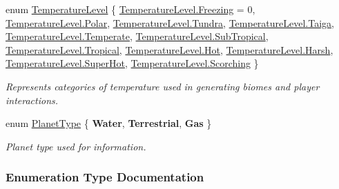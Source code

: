 \begin{DoxyCompactItemize}
\item 
enum \hyperlink{namespace_midnight_blue_a6ea6484178cbe707f25d1a0ed56db7ab}{Temperature\+Level} \{ \newline
\hyperlink{namespace_midnight_blue_a6ea6484178cbe707f25d1a0ed56db7aba64a54c31b5b440b2f5a00a723df03ec4}{Temperature\+Level.\+Freezing} = 0, 
\hyperlink{namespace_midnight_blue_a6ea6484178cbe707f25d1a0ed56db7abae266cfd65ad46a67fc54b0efd38e40dd}{Temperature\+Level.\+Polar}, 
\hyperlink{namespace_midnight_blue_a6ea6484178cbe707f25d1a0ed56db7abac63e2bf2eb1c92832e0a76fb3734abe8}{Temperature\+Level.\+Tundra}, 
\hyperlink{namespace_midnight_blue_a6ea6484178cbe707f25d1a0ed56db7aba32864c09ef538453b4d8110734ee355b}{Temperature\+Level.\+Taiga}, 
\newline
\hyperlink{namespace_midnight_blue_a6ea6484178cbe707f25d1a0ed56db7abae83280629ee0ad3886e8921fb8927ced}{Temperature\+Level.\+Temperate}, 
\hyperlink{namespace_midnight_blue_a6ea6484178cbe707f25d1a0ed56db7abaee38ff3caffad90ba40d7fd7ce41c9ae}{Temperature\+Level.\+Sub\+Tropical}, 
\hyperlink{namespace_midnight_blue_a6ea6484178cbe707f25d1a0ed56db7aba4616594df26c58d9dbed290898452f67}{Temperature\+Level.\+Tropical}, 
\hyperlink{namespace_midnight_blue_a6ea6484178cbe707f25d1a0ed56db7aba4194726ee334e1085d93e002837b73f0}{Temperature\+Level.\+Hot}, 
\newline
\hyperlink{namespace_midnight_blue_a6ea6484178cbe707f25d1a0ed56db7abad6b8294df3871e4689e0f4964b4a1219}{Temperature\+Level.\+Harsh}, 
\hyperlink{namespace_midnight_blue_a6ea6484178cbe707f25d1a0ed56db7aba804a73886e309aa19afbc92553edd52a}{Temperature\+Level.\+Super\+Hot}, 
\hyperlink{namespace_midnight_blue_a6ea6484178cbe707f25d1a0ed56db7aba35b2d04e25785c4ddff96c0caf345681}{Temperature\+Level.\+Scorching}
 \}\begin{DoxyCompactList}\small\item\em Represents categories of temperature used in generating biomes and player interactions. \end{DoxyCompactList}
\item 
enum \hyperlink{namespace_midnight_blue_a4a799009a18b57979628708589ae53e3}{Planet\+Type} \{ {\bfseries Water}, 
{\bfseries Terrestrial}, 
{\bfseries Gas}
 \}\begin{DoxyCompactList}\small\item\em Planet type used for information. \end{DoxyCompactList}
\end{DoxyCompactItemize}


\subsubsection{Enumeration Type Documentation}
\hypertarget{namespace_midnight_blue_a8a6ba5637b64c3eb991f00d48decf381}{}\label{namespace_midnight_blue_a8a6ba5637b64c3eb991f00d48decf381} 
